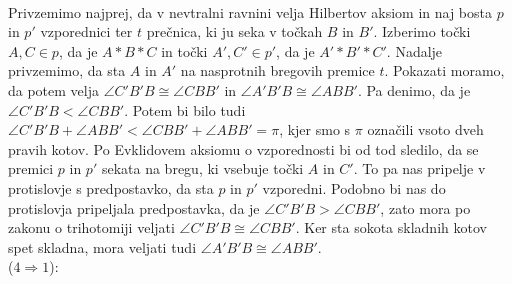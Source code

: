 \begin{dokaz}
            \\ Privzemimo najprej, da v nevtralni ravnini velja Hilbertov aksiom in naj bosta $p$ in $p'$ vzporednici ter $t$ prečnica, ki ju seka v točkah $B$ in $B'$. Izberimo točki $A, C \in p$, da je $A\ast B\ast C$ in točki $A', C' \in p'$, da je $A'\ast B'\ast C'$. Nadalje privzemimo, da sta $A$ in $A'$ na nasprotnih bregovih premice $t$. Pokazati moramo, da potem velja $\angle C'B'B \cong\angle CBB'$ in $\angle A'B'B\cong\angle ABB'$. Pa denimo, da je $\angle C'B'B <\angle CBB'$. Potem bi bilo tudi $\angle C'B'B + \angle ABB' < \angle CBB' + \angle ABB' =\pi$, kjer smo s $\pi$ označili vsoto dveh pravih kotov. Po Evklidovem aksiomu o vzporednosti bi od tod sledilo, da se premici $p$ in $p'$ sekata na bregu, ki vsebuje točki $A$ in $C'$. To pa nas pripelje v protislovje s predpostavko, da sta $p$ in $p'$ vzporedni. Podobno bi nas do protislovja pripeljala predpostavka, da je $\angle C'B'B > \angle CBB'$, zato mora po zakonu o trihotomiji veljati $\angle C'B'B\cong\angle CBB'$. Ker sta sokota skladnih kotov spet skladna, mora veljati tudi $\angle A'B'B\cong\angle ABB'$. 
            \\ ($4 \Rightarrow 1$): 
            \\ 
\end{dokaz}
